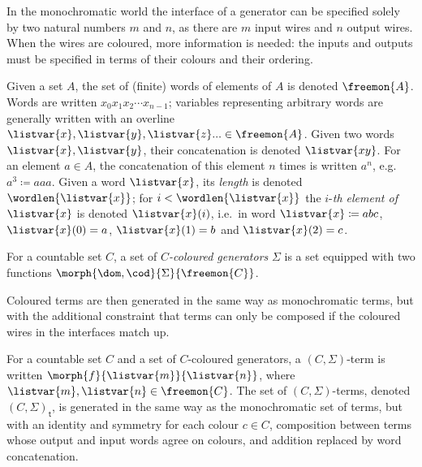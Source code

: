 In the monochromatic world the interface of a generator can be specified solely
by two natural numbers \(m\) and \(n\), as there are \(m\) input wires and
\(n\) output wires.
When the wires are coloured, more information is needed: the inputs and outputs
must be specified in terms of their colours and their ordering.

\begin{notation}[Words]
    Given a set \(A\), the set of (finite) words of elements of \(A\) is denoted
    \(\freemon{A}\).
    Words are written \(x_0x_1x_2{\cdots}x_{n-1}\); variables representing
    arbitrary words are generally written with an
    overline \(
    \listvar{x}, \listvar{y}, \listvar{z}... \in \freemon{A}
    \).
    Given two words \(\listvar{x}, \listvar{y}\), their concatenation is
    denoted \(\listvar{xy}\).
    For an element \(a \in A\), the concatenation of this element \(n\) times is
    written \(a^n\), e.g.\ \(a^3 \coloneqq aaa\).
    Given a word \(\listvar{x}\), its \emph{length} is denoted
    \(\wordlen{\listvar{x}}\); for \(i < \wordlen{\listvar{x}}\) the
    \(i\)-\emph{th element of \(\listvar{x}\)} is denoted \(\listvar{x}(i)\),
    i.e.\ in word \(\listvar{x} \coloneqq abc\), \(\listvar{x}(0) = a\),
    \(\listvar{x}(1) = b\) and \(\listvar{x}(2) = c\).
\end{notation}

\begin{definition}
    For a countable set \(C\), a set of \emph{\(C\)-coloured generators}
    \(\Sigma\) is a set equipped with two functions
    \(\morph{\dom,\cod}{\Sigma}{\freemon{C}}\).
\end{definition}

Coloured terms are then generated in the same way as monochromatic terms, but
with the additional constraint that terms can only be composed if the coloured
wires in the interfaces match up.

\begin{definition}
    For a countable set \(C\) and a set of \(C\)-coloured generators, a
    \((C,\Sigma)\)-term is written \(\morph{f}{\listvar{m}}{\listvar{n}}\),
    where \(\listvar{m},\listvar{n} \in \freemon{C}\).
    The set of \((C,\Sigma)\)-terms, denoted \((C,\Sigma)_\mathsf{t}\), is
    generated in the same way as the monochromatic set of terms, but with an
    identity and symmetry for each colour \(c \in C\), composition between
    terms whose output and input words agree on colours, and addition replaced
    by word concatenation.
\end{definition}

